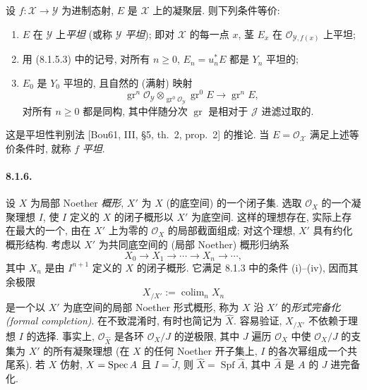 设 $f:\mathcal X\to\mathcal Y$ 为进制态射, $E$ 是 $\mathcal X$ 上的凝聚层. 则下列条件等价:
\begin{enumerate}
\item[(i)] $E$ 在 $\mathcal Y$ 上\emph{平坦} (或称 $\mathcal Y$ \emph{平坦}); 即对 $\mathcal X$ 的每一点 $x$, 茎 $E_x$ 在 $\mathcal O_{\mathcal Y,f(x)}$ 上平坦;
\item[(ii)] 用 (8.1.5.3) 中的记号, 对所有 $n\geq0$, $E_n=u_n^*E$ 都是 $Y_n$ 平坦的;
\item[(iii)] $E_0$ 是 $Y_0$ 平坦的, 且自然的 (满射) 映射
\[\operatorname{gr}^n\mathcal O_{\mathcal Y}\otimes_{\operatorname{gr}^0\mathcal O_{\mathcal Y}}\operatorname{gr}^0E\longrightarrow\operatorname{gr}^nE,\]
对所有 $n\geq0$ 都是同构, 其中伴随分次 $\operatorname{gr}$ 是相对于 $\mathcal J$ 进滤过取的.
\end{enumerate}
这是平坦性判别法 [Bou61, III, §5, th.~2, prop.~2] 的推论. 当 $E=\mathcal O_{\mathcal X}$ 满足上述等价条件时, 就称 $f$ \emph{平坦}.

\paragraph{8.1.6.}
设 $X$ 为局部 Noether \emph{概形}, $X'$ 为 $X$ (的底空间) 的一个闭子集. 选取 $\mathcal O_X$ 的一个凝聚理想 $I$, 使 $I$ 定义的 $X$ 的闭子概形以 $X'$ 为底空间. 这样的理想存在, 实际上存在最大的一个, 由在 $X'$ 上为零的 $\mathcal O_X$ 的局部截面组成; 对这个理想, $X'$ 具有约化概形结构. 考虑以 $X'$ 为共同底空间的 (局部 Noether) 概形归纳系
\[X_0\longrightarrow X_1\longrightarrow\cdots\longrightarrow X_n\longrightarrow\cdots,\]
其中 $X_n$ 是由 $I^{n+1}$ 定义的 $X$ 的闭子概形. 它满足 8.1.3 中的条件 (i)--(iv), 因而其余极限
\begin{equation}X_{/X'}:=\operatorname{colim}_n X_n\tag{8.1.6.1}\label{ch08:eq8161}\end{equation}
是一个以 $X'$ 为底空间的局部 Noether 形式概形, 称为 $X$ 沿 $X'$ 的\emph{形式完备化 (formal completion)}. 在不致混淆时, 有时也简记为 $\widehat X$. 容易验证, $X_{/X'}$ 不依赖于理想 $I$ 的选择.
事实上, $\mathcal O_{\widehat X}$ 是各环 $\mathcal O_X/J$ 的逆极限, 其中 $J$ 遍历 $\mathcal O_X$ 中使 $\mathcal O_X/J$ 的支集为 $X'$ 的所有凝聚理想 (在 $X$ 的任何 Noether 开子集上, $I$ 的各次幂组成一个共尾系). 若 $X$ 仿射, $X=\operatorname{Spec} A$ 且 $I=\widetilde J$, 则 $\widehat X=\operatorname{Spf}\widehat A$, 其中 $\widehat A$ 是 $A$ 的 $J$ 进完备化.

